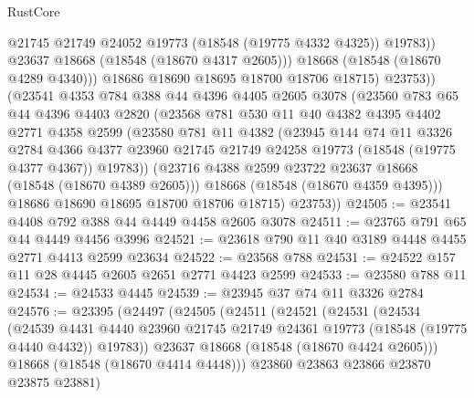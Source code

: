 \begin{lexlean}{RustCore}
\begin{coremodule}
                    @21745
                    @21749
                    @24052
                    @19773
                    (@18548 (@19775 @4332 @4325))
                    @19783))
                @23637
                @18668
                (@18548 (@18670 @4317 @2605)))
              @18668
              (@18548 (@18670 @4289 @4340)))
            @18686
            @18690
            @18695
            @18700
            @18706
            @18715)
          @23753))
      (@23541
        @4353
        @784
        @388
        @44
        @4396
        @4405
        @2605
        @3078
        (@23560
          @783
          @65
          @44
          @4396
          @4403
          @2820
          (@23568
            @781
            @530
            @11
            @40
            @4382
            @4395
            @4402
            @2771
            @4358
            @2599
            (@23580
              @781
              @11
              @4382
              (@23945
                @144
                @74
                @11
                @3326
                @2784
                @4366
                @4377
                @23960
                @21745
                @21749
                @24258
                @19773
                (@18548 (@19775 @4377 @4367))
                @19783))
            (@23716 @4388 @2599 @23722 @23637 @18668 (@18548 (@18670 @4389 @2605)))
            @18668
            (@18548 (@18670 @4359 @4395)))
          @18686
          @18690
          @18695
          @18700
          @18706
          @18715)
        @23753))
@24505 := @23541 @4408 @792 @388 @44 @4449 @4458 @2605 @3078
@24511 := @23765 @791 @65 @44 @4449 @4456 @3996
@24521 := @23618 @790 @11 @40 @3189 @4448 @4455 @2771 @4413 @2599 @23634
@24522 := @23568 @788
@24531 := @24522 @157 @11 @28 @4445 @2605 @2651 @2771 @4423 @2599
@24533 := @23580 @788 @11
@24534 := @24533 @4445
@24539 := @23945 @37 @74 @11 @3326 @2784
@24576 := @23395
    (@24497
      (@24505
        (@24511
          (@24521
            (@24531
              (@24534
                (@24539
                  @4431
                  @4440
                  @23960
                  @21745
                  @21749
                  @24361
                  @19773
                  (@18548 (@19775 @4440 @4432))
                  @19783))
              @23637
              @18668
              (@18548 (@18670 @4424 @2605)))
            @18668
            (@18548 (@18670 @4414 @4448)))
          @23860
          @23863
          @23866
          @23870
          @23875
          @23881)

\end{coremodule}
\end{lexlean}
